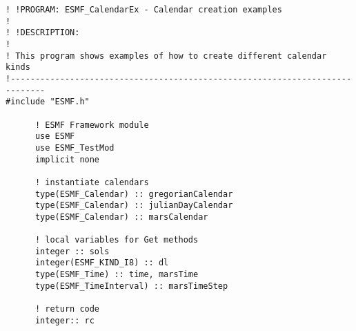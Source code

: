  
\setlength{\oldparskip}{\parskip}
\setlength{\parskip}{1.5ex}
\setlength{\oldparindent}{\parindent}
\setlength{\parindent}{0pt}
\setlength{\oldbaselineskip}{\baselineskip}
\setlength{\baselineskip}{11pt}
 
\def\bv{\begin{verbatim}}
\def\ev{\end{verbatim}}
\def\be{\begin{equation}}
\def\ee{\end{equation}}
\def\bea{\begin{eqnarray}}
\def\eea{\end{eqnarray}}
\def\bi{\begin{itemize}}
\def\ei{\end{itemize}}
\def\bn{\begin{enumerate}}
\def\en{\end{enumerate}}
\def\bd{\begin{description}}
\def\ed{\end{description}}
\def\({\left (}
\def\){\right )}
\def\[{\left [}
\def\]{\right ]}
\def\<{\left  \langle}
\def\>{\right \rangle}
\def\cI{{\cal I}}
\def\diag{\mathop{\rm diag}}
\def\tr{\mathop{\rm tr}}


 

 \begin{verbatim}
! !PROGRAM: ESMF_CalendarEx - Calendar creation examples
!
! !DESCRIPTION:
!
! This program shows examples of how to create different calendar kinds
!-----------------------------------------------------------------------------
#include "ESMF.h"

      ! ESMF Framework module
      use ESMF
      use ESMF_TestMod
      implicit none

      ! instantiate calendars
      type(ESMF_Calendar) :: gregorianCalendar
      type(ESMF_Calendar) :: julianDayCalendar
      type(ESMF_Calendar) :: marsCalendar

      ! local variables for Get methods
      integer :: sols
      integer(ESMF_KIND_I8) :: dl
      type(ESMF_Time) :: time, marsTime
      type(ESMF_TimeInterval) :: marsTimeStep

      ! return code
      integer:: rc
 
\end{verbatim}
 
